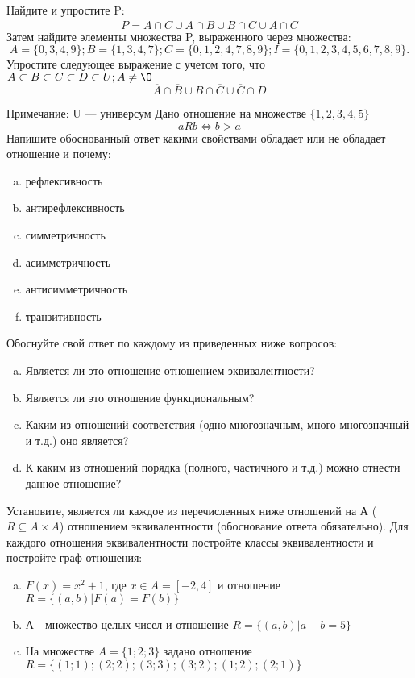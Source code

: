 \documentclass[10pt]{exam}
\begin{document}
\begin{questions}
\question
Найдите и упростите P:
\begin{equation*}
\overline{P} = A \cap \overline{C} \cup A \cap \overline{B} \cup B \cap \overline{C} \cup A \cap C
\end{equation*}
Затем найдите элементы множества P, выраженного через множества:
\begin{equation*}
A = \{0, 3, 4, 9\}; 
B = \{1, 3, 4, 7\};
C = \{0, 1, 2, 4, 7, 8, 9\};
I = \{0, 1, 2, 3, 4, 5, 6, 7, 8, 9\}.
\end{equation*}\question
Упростите следующее выражение с учетом того, что $A\subset B \subset C \subset D \subset U; A \neq \O$
\begin{equation*}
\overline{A} \cap \overline{B} \cup B \cap \overline{C} \cup \overline{C} \cap D
\end{equation*}

Примечание: U — универсум\question
Дано отношение на множестве $\{1, 2, 3, 4, 5\}$ 
\begin{equation*}
aRb \iff b > a
\end{equation*}
Напишите обоснованный ответ какими свойствами обладает или не обладает отношение и почему:   
\begin{enumerate} [a)]\setcounter{enumi}{0}
\item рефлексивность
\item антирефлексивность
\item симметричность
\item асимметричность
\item антисимметричность
\item транзитивность
\end{enumerate}

Обоснуйте свой ответ по каждому из приведенных ниже вопросов:
\begin{enumerate} [a)]\setcounter{enumi}{0}
    \item Является ли это отношение отношением эквивалентности?
    \item Является ли это отношение функциональным?
    \item Каким из отношений соответствия (одно-многозначным, много-многозначный и т.д.) оно является?
    \item К каким из отношений порядка (полного, частичного и т.д.) можно отнести данное отношение?
\end{enumerate}

\question
Установите, является ли каждое из перечисленных ниже отношений на А ($R \subseteq A \times A$) отношением эквивалентности (обоснование ответа обязательно). Для каждого отношения эквивалентности постройте классы эквивалентности и постройте граф отношения:
\begin{enumerate} [a)]\setcounter{enumi}{0}
\item $F(x)=x^{2}+1$, где $x \in A = [-2, 4]$ и отношение $R = \{(a,b)|F(a) = F(b)\}$
\item А - множество целых чисел и отношение $R = \{(a,b)|a + b = 5\}$
\item На множестве $A = \{1; 2; 3\}$ задано отношение $R = \{(1; 1); (2; 2); (3; 3); (3; 2); (1; 2); (2; 1)\}$


\end{enumerate}
\end{questions}
\end{document}
